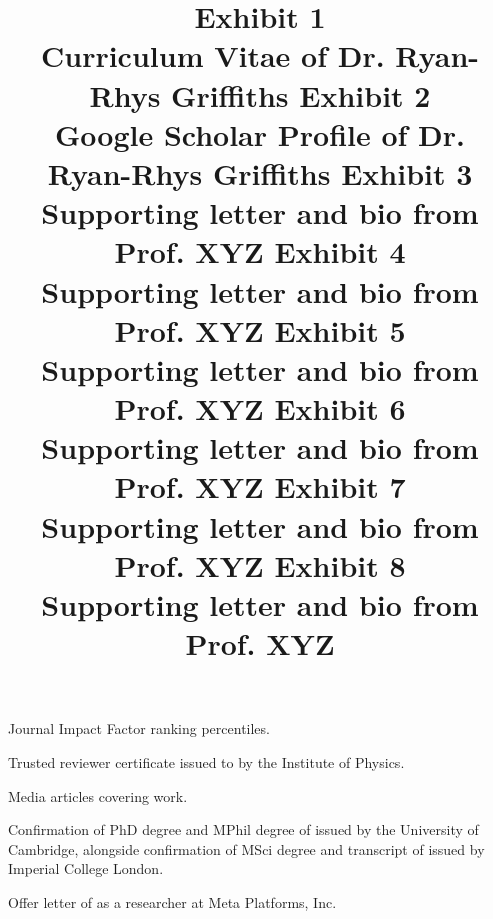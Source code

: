 \documentclass[11pt]{article}
\begin{document}
\begin{thebibliography}{9}
Journal Impact Factor ranking percentiles.

Trusted reviewer certificate issued to \dr by the Institute of Physics.

Media articles covering \drs work.

Confirmation of PhD degree and MPhil degree of \dr issued by the University of Cambridge, alongside confirmation of MSci degree and transcript of \dr issued by Imperial College London.

Offer letter of \dr as a researcher at Meta Platforms, Inc.

\end{thebibliography}

\pagebreak

\newcommand{\ip}[1]{}
\newcommand{\ex}[2]{
\title{\textbf{\huge{Exhibit #1}}\\
\vspace{3em}
\Large{#2}
}
\author{}
\maketitle
}


\ex{1}{Curriculum Vitae of Dr. Ryan-Rhys Griffiths}
\ip{aux/CV.pdf}
  
\ex{2}{Google Scholar Profile of Dr. Ryan-Rhys Griffiths}
\ip{aux/google_scholar.pdf}
 
\ex{3}{Supporting letter and bio from Prof. XYZ}


\ex{4}{Supporting letter and bio from Prof. XYZ}

 
 \ex{5}{Supporting letter and bio from Prof. XYZ}
 
 
 \ex{6}{Supporting letter and bio from Prof. XYZ}
 
 
 \ex{7}{Supporting letter and bio from Prof. XYZ}
 
 
 \ex{8}{Supporting letter and bio from Prof. XYZ}

 
 
\end{document}

